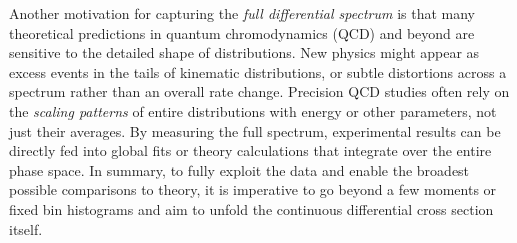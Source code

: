     Another motivation for capturing the \emph{full differential spectrum} is that many theoretical predictions in quantum chromodynamics (QCD) and beyond are sensitive to the detailed shape of distributions.
    New physics might appear as excess events in the tails of kinematic distributions, or subtle distortions across a spectrum rather than an overall rate change.
    Precision QCD studies often rely on the \emph{scaling patterns} of entire distributions with energy or other parameters, not just their averages.
    By measuring the full spectrum, experimental results can be directly fed into global fits or theory calculations that integrate over the entire phase space.
    In summary, to fully exploit the data and enable the broadest possible comparisons to theory, it is imperative to go beyond a few moments or fixed bin histograms and aim to unfold the continuous differential cross section itself.


